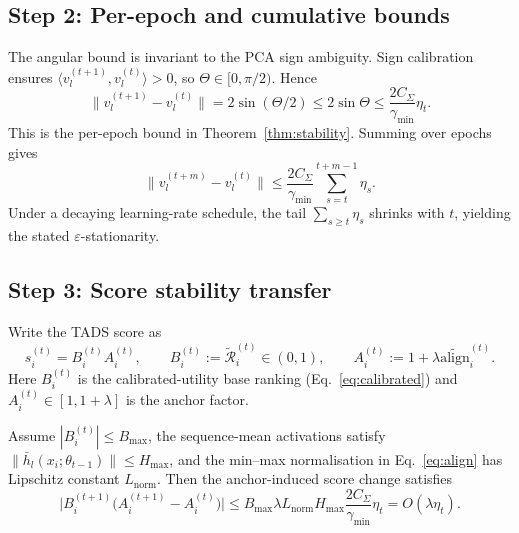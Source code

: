 \subsection{Step 2: Per-epoch and cumulative bounds}
\label{app:step-euclidean}

The angular bound is invariant to the PCA sign ambiguity. Sign
calibration ensures
$\langle v_l^{(t+1)},v_l^{(t)}\rangle>0$, so
$\Theta\in[0,\pi/2)$. Hence
\begin{equation}
  \bigl\|v_l^{(t+1)}-v_l^{(t)}\bigr\|
  =
  2\sin(\Theta/2)
  \le
  2\sin\Theta
  \le
  \frac{2C_\Sigma}{\gamma_{\min}}\eta_t .
  \label{eq:perepoch-bound}
\end{equation}
This is the per-epoch bound in Theorem~\ref{thm:stability}. Summing
over epochs gives
\begin{equation}
  \bigl\|v_l^{(t+m)}-v_l^{(t)}\bigr\|
  \le
  \frac{2C_\Sigma}{\gamma_{\min}}
  \sum_{s=t}^{t+m-1}\eta_s .
  \label{eq:cumulative-bound-app}
\end{equation}
Under a decaying learning-rate schedule, the tail
$\sum_{s\ge t}\eta_s$ shrinks with $t$, yielding the stated
$\varepsilon$-stationarity.

\subsection{Step 3: Score stability transfer}
\label{app:score-stability}

Write the \textsc{TADS} score as
\[
s_i^{(t)} = B_i^{(t)}A_i^{(t)},
\qquad
B_i^{(t)} := \tilde{\mathcal{R}}_i^{(t)} \in (0,1),
\qquad
A_i^{(t)} := 1+\lambda\widetilde{\mathrm{align}}_i^{(t)} .
\]
Here $B_i^{(t)}$ is the calibrated-utility base ranking
(Eq.~\ref{eq:calibrated}) and $A_i^{(t)}\in[1,1+\lambda]$ is the
anchor factor.

\begin{corollary}
\label{cor:score-stability}
Assume $|B_i^{(t)}|\le B_{\max}$, the sequence-mean activations
satisfy $\|\bar h_l(x_i;\theta_{t-1})\|\le H_{\max}$, and the
min--max normalisation in Eq.~\ref{eq:align} has Lipschitz constant
$L_{\mathrm{norm}}$. Then the anchor-induced score change satisfies
\begin{equation}
  \bigl|
  B_i^{(t+1)}
  \bigl(A_i^{(t+1)}-A_i^{(t)}\bigr)
  \bigr|
  \le
  B_{\max}\lambda L_{\mathrm{norm}}H_{\max}
  \frac{2C_\Sigma}{\gamma_{\min}}\eta_t
  =
  O(\lambda\eta_t).
  \label{eq:cor-score-bound}
\end{equation}
\end{corollary}

